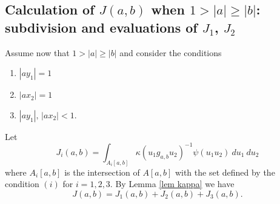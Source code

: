 \documentclass[12pt]{amsart}
\newcommand{\abs}[1]{\left|{#1}\right|}
\theoremstyle{remark}
\begin{document}
\subsection{Calculation of $J(a,b)$ when $1>\abs{a}\ge\abs{b}$: subdivision and evaluations of $J_1$, $J_2$}
Assume now that $1>\abs{a}\ge \abs{b}$ and consider the conditions
\begin{enumerate}
\item $\abs{ay_1}=1$
\item $\abs{ax_2}=1$ 
\item $\abs{ay_1},\,\abs{ax_2}<1$.
\end{enumerate}
Let 
\[
J_i(a,b)=\int_{A_i[a,b]}\kappa(u_1g_{a,b}u_2)^{-1}\psi(u_1u_2)\ du_1\ du_2
\] 
where $A_i[a,b]$ is the intersection of $A[a,b]$ with the set defined by the condition $(i)$ for $i=1,2,3$. By Lemma \ref{lem kappa} we have
\begin{equation}\label{eq break j}
J(a,b)=J_1(a,b)+J_2(a,b)+J_3(a,b).
\end{equation}
\end{document}
